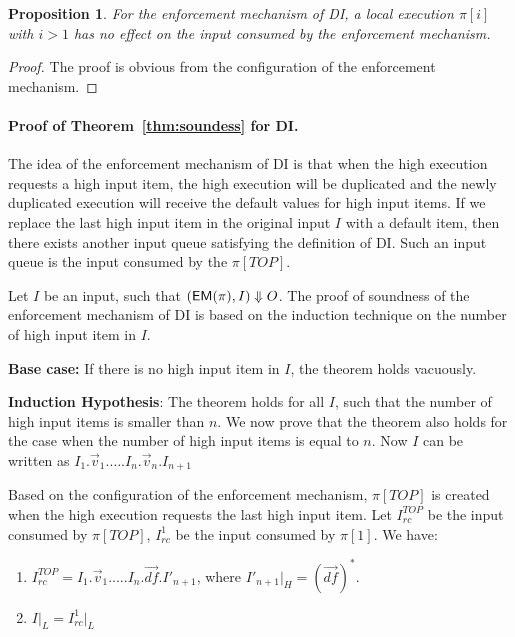 \documentclass[10pt,a4paper,oneside]{article}
\newtheorem{proposition}{Proposition}[section]
\def\execution#1#2#3{\ensuremath{(#1, #2)\Downarrow#3}}
\def\defseq#1{\ensuremath{#1 = (\defvec)^*}}
\def\loweq#1#2{\ensuremath{\restrict{#1}{L} = \restrict{#2}{L}}}
\def\Irc#1{\ensuremath{I_{rc}^{#1}}}
\def\restrict#1#2{\ensuremath{{#1}|_{#2}}}
\def\TOP{\ensuremath{TOP}}
\def\sanserif#1{\ensuremath{\sf #1}}
\def\defvec{\ensuremath{\vec{df}}}
\def\EM{\ensuremath{{\sanserif{EM}}}}
\def\Prog{\ensuremath{\pi}}
\def\Progl#1{\ensuremath{\Prog[#1]}}
\def\EMP{\ensuremath{\EM(}\ensuremath{\Prog)}}
\begin{document}
\begin{proposition} \label{prop:DI:inputconsumed}
For the enforcement mechanism of DI, a local execution \Progl{i} with $i > 1$ has no effect on the input consumed by the enforcement mechanism.
\end{proposition}
\begin{proof}
The proof is obvious from the configuration of the enforcement mechanism.
\end{proof}


\paragraph{Proof of Theorem~\ref{thm:soundess} for DI.}
The idea of the enforcement mechanism of DI is that when the high execution requests a high input item, the high execution will be duplicated and the newly duplicated execution will receive the default values for high input items. If we replace the last high input item in the original input $I$ with a default item, then there exists another input queue satisfying the definition of DI. Such an input queue is the input consumed by the \Progl{\TOP}.




Let $I$ be an input, such that \execution{\EMP}{I}{O}. The proof of soundness of the enforcement mechanism of DI is based on the induction technique on the number of high input item in $I$.

\textbf{Base case:} If there is no high input item in $I$, the theorem holds vacuously.

\textbf{Induction Hypothesis}: The theorem holds for all $I$, such that the number of high input items is smaller than $n$. We now prove that the theorem also holds for the case when the number of high input items is equal to $n$. Now $I$ can be written as $I_1.\vec{v}_1.\dots.I_n.\vec{v}_n.I_{n+1}$



Based on the configuration of the enforcement mechanism, \Progl{TOP} is created when the high execution requests the last high input item. Let \Irc{\TOP} be the input consumed by \Progl{TOP}, \Irc{1} be the input consumed by \Progl{1}. We have:
\begin{enumerate}
\item $\Irc{\TOP} = I_1.\vec{v}_1.\dots.I_n.\defvec.I'_{n+1}$, where \defseq{I'_{n+1}|_H}. \label{DI:step:InputTOP}

\item \loweq{I}{\Irc{1}} \label{DI:step:InputLow}
\end{enumerate}
\end{document}
